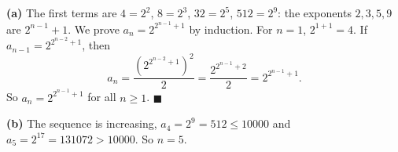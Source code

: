 \textbf{(a)} The first terms are $4=2^2$, $8=2^3$, $32=2^5$, $512=2^9$: the exponents $2,3,5,9$ are $2^{n-1}+1$. We prove $a_n=2^{2^{n-1}+1}$ by induction. For $n=1$, $2^{1+1}=4$. If $a_{n-1}=2^{2^{n-2}+1}$, then
\[a_n=\dfrac{\left(2^{2^{n-2}+1}\right)^2}{2}=\dfrac{2^{2^{n-1}+2}}{2}=2^{2^{n-1}+1}.\]
So $\boxed{a_n=2^{2^{n-1}+1}}$ for all $n\ge1$. $\blacksquare$

\textbf{(b)} The sequence is increasing, $a_4=2^9=512\le10000$ and $a_5=2^{17}=131072>10000$. So $n=\boxed{5}$.
